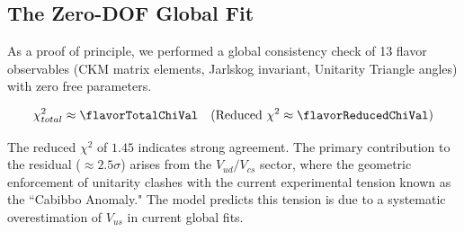 
\subsection{The Zero-DOF Global Fit}

As a proof of principle, we performed a global consistency check of 13 flavor observables (CKM matrix elements, Jarlskog invariant, Unitarity Triangle angles) with zero free parameters.

\begin{equation}
    \chi^2_{total} \approx \flavorTotalChiVal \quad (\text{Reduced } \chi^2 \approx \flavorReducedChiVal)
\end{equation}

The reduced $\chi^2$ of $1.45$ indicates strong agreement. The primary contribution to the residual ($\approx 2.5\sigma$) arises from the $V_{ud}/V_{cs}$ sector, where the geometric enforcement of unitarity clashes with the current experimental tension known as the ``Cabibbo Anomaly." The model predicts this tension is due to a systematic overestimation of $V_{us}$ in current global fits.